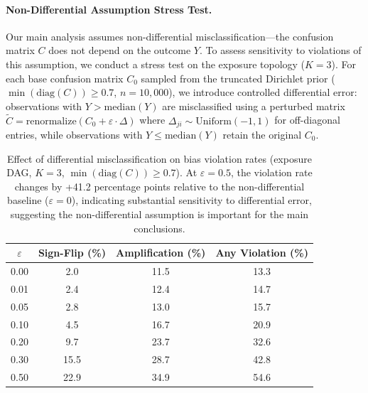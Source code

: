 \paragraph{Non-Differential Assumption Stress Test.}
Our main analysis assumes non-differential misclassification---the confusion matrix $C$ does not depend on the outcome $Y$.
To assess sensitivity to violations of this assumption, we conduct a stress test on the exposure topology ($K{=}3$).
For each base confusion matrix $C_0$ sampled from the truncated Dirichlet prior ($\min(\mathrm{diag}(C)) \geq 0.7$, $n=10,000$),
we introduce controlled differential error: observations with $Y > \mathrm{median}(Y)$ are misclassified
using a perturbed matrix $\tilde{C} = \mathrm{renormalize}(C_0 + \varepsilon \cdot \Delta)$ where
$\Delta_{ji} \sim \mathrm{Uniform}(-1,1)$ for off-diagonal entries, while observations with
$Y \leq \mathrm{median}(Y)$ retain the original $C_0$.

\begin{table}[h]
\centering
\small
\begin{tabular}{cccc}
\toprule
$\varepsilon$ & Sign-Flip (\%) & Amplification (\%) & Any Violation (\%) \\
\midrule
0.00 & 2.0 & 11.5 & 13.3 \\
0.01 & 2.4 & 12.4 & 14.7 \\
0.05 & 2.8 & 13.0 & 15.7 \\
0.10 & 4.5 & 16.7 & 20.9 \\
0.20 & 9.7 & 23.7 & 32.6 \\
0.30 & 15.5 & 28.7 & 42.8 \\
0.50 & 22.9 & 34.9 & 54.6 \\
\bottomrule
\end{tabular}
\caption{Effect of differential misclassification on bias violation rates (exposure DAG, $K{=}3$, $\min(\mathrm{diag}(C)) \geq 0.7$).
At $\varepsilon = 0.5$, the violation rate changes by +41.2 percentage points relative to the non-differential baseline ($\varepsilon = 0$), indicating substantial sensitivity to differential error, suggesting the non-differential assumption is important for the main conclusions.}
\label{tab:nondiff_stress}
\end{table}


